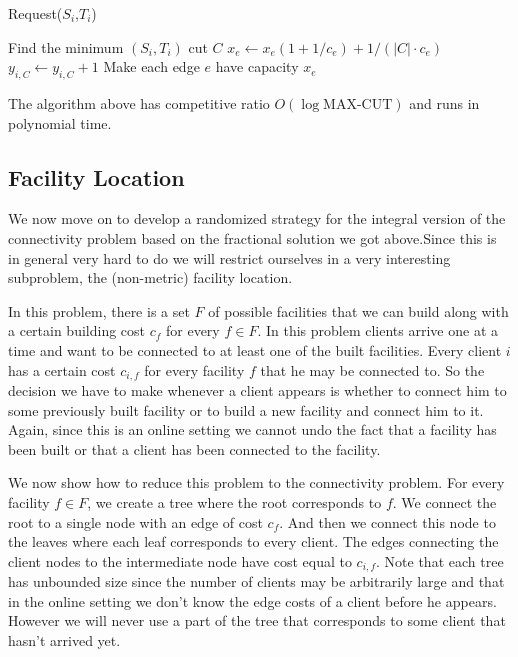 \begin{algorithm}
\caption{Request($S_i$,$T_i$)}
\begin{algorithmic}[1]
  \STATE Find the minimum  $(S_i,T_i)$ cut $C$
    \STATE $x_e \leftarrow x_e (1 + 1/c_e) + 1/(|C| \cdot c_e)$ 
  \ENDFOR
  \STATE $y_{i,C} \leftarrow y_{i,C} + 1$
\ENDWHILE
\STATE Make each edge $e$ have capacity $x_e$
\end{algorithmic}
\end{algorithm}

The algorithm above has competitive ratio $O( \log \textrm{MAX-CUT} )$ and runs in polynomial time.

\subsection{Facility Location}
We now move on to develop a randomized strategy for the integral version of the connectivity problem based on the fractional solution we got above.Since this is in general very hard to do we will restrict ourselves in a very interesting subproblem, the (non-metric) facility location.

In this problem, there is a set $F$ of possible facilities that we can build along with a certain building cost $c_f$ for every $f \in F$. In this problem clients arrive one at a time and want to be connected to at least one of the built facilities. Every client $i$ has a certain cost $c_{i,f}$ for every facility $f$ that he may be connected to. So the decision we have to make whenever a client appears is whether to connect him to some previously built facility or to build a new facility and connect him to it. Again, since this is an online setting we cannot undo the fact that a facility has been built or that a client has been connected to the facility.

We now show how to reduce this problem to the connectivity problem. For every facility $f \in F$, we create a tree where the root corresponds to $f$. We connect the root to a single node with an edge of cost $c_f$. And then we connect this node to the leaves where each leaf corresponds to every client. The edges connecting the client nodes to the intermediate node have cost equal to $c_{i,f}$. Note that each tree has unbounded size since the number of clients may be arbitrarily large and that in the online setting we don't know the edge costs of a client before he appears. However we will never use a part of the tree that corresponds to some client that hasn't arrived yet.

